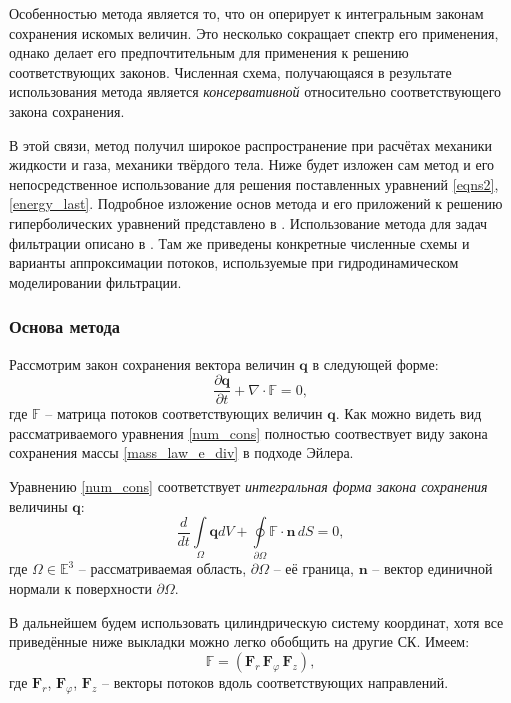 	Особенностью метода является то, что он оперирует к интегральным законам сохранения искомых величин.
	Это несколько сокращает спектр его применения, однако делает его предпочтительным для применения к решению соответствующих законов.
	Численная схема, получающаяся в результате использования метода является \textit{консервативной} относительно соответствующего закона сохранения.

	В этой связи, метод получил широкое распространение при расчётах механики жидкости и газа, механики твёрдого тела. 
	Ниже будет изложен сам метод и его непосредственное использование для решения поставленных уравнений \eqref{eqns2}, \eqref{energy_last}.
	Подробное изложение основ метода и его приложений к решению гиперболических уравнений представлено в \cite{leveque}.
	Использование метода для задач фильтрации описано в \cite{kanevskaya}.
	Там же приведены конкретные численные схемы и варианты аппроксимации потоков, используемые при гидродинамическом моделировании фильтрации.

\subsubsection{Основа метода}
	Рассмотрим закон сохранения вектора величин $\boldsymbol{q}$ в следующей форме:
\begin{equation}
	\label{num_cons}
	\frac{\partial \boldsymbol{q}}{\partial t} + \nabla \cdot \mathbb{F} = 0,
\end{equation}
	где $\mathbb{F}$ -- матрица потоков соответствующих величин $\boldsymbol{q}$.
	Как можно видеть вид рассматриваемого уравнения \eqref{num_cons} полностью соотвествует виду закона сохранения массы \eqref{mass_law_e_div} в подходе Эйлера.

	Уравнению \eqref{num_cons} соответствует \textit{интегральная форма закона сохранения} величины $\boldsymbol{q}$:
\begin{equation}
	\label{num_cons_int}
	\frac{d}{dt}\int\limits_{\Omega}\boldsymbol{q}dV + \oint\limits_{\partial \Omega}\mathbb{F}\cdot \boldsymbol{n}\, dS = 0,
\end{equation}
	где $\Omega \in \mathbb{E}^3$ -- рассматриваемая область, $\partial \Omega$ -- её граница,
	$\boldsymbol{n}$ -- вектор единичной нормали к поверхности $\partial \Omega$.

	В дальнейшем будем использовать цилиндрическую систему координат, хотя все приведённые ниже выкладки можно легко обобщить на другие СК. Имеем:
\begin{equation}
	\label{num_cons_int}
	\mathbb{F} = \left(\boldsymbol{F}_r\,\boldsymbol{F}_{\varphi}\,\boldsymbol{F}_z\right),
\end{equation}
	где $\boldsymbol{F}_r$, $\boldsymbol{F}_{\varphi}$, $\boldsymbol{F}_z$ -- векторы потоков вдоль соответствующих направлений.

